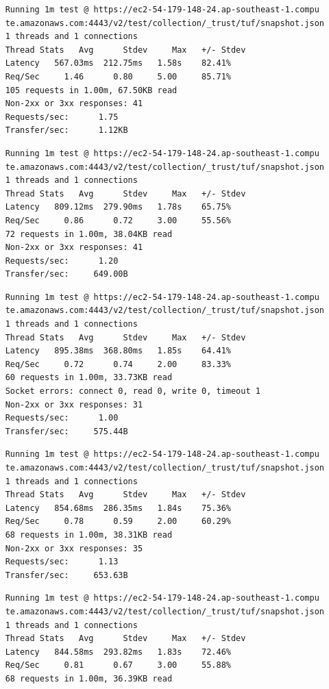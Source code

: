 \documentclass[a4paper,12pt]{article}
\newcounter{subsubsubsection}[subsubsection]
\begin{document}
{{\begin{verbatim}
	Running 1m test @ https://ec2-54-179-148-24.ap-southeast-1.compu
	te.amazonaws.com:4443/v2/test/collection/_trust/tuf/snapshot.json
	1 threads and 1 connections
	Thread Stats   Avg      Stdev     Max   +/- Stdev
	Latency   567.03ms  212.75ms   1.58s    82.41%
	Req/Sec     1.46      0.80     5.00     85.71%
	105 requests in 1.00m, 67.50KB read
	Non-2xx or 3xx responses: 41
	Requests/sec:      1.75
	Transfer/sec:      1.12KB
	\end{verbatim}
	\newpage
	\begin{verbatim}
	Running 1m test @ https://ec2-54-179-148-24.ap-southeast-1.compu
	te.amazonaws.com:4443/v2/test/collection/_trust/tuf/snapshot.json
	1 threads and 1 connections
	Thread Stats   Avg      Stdev     Max   +/- Stdev
	Latency   809.12ms  279.90ms   1.78s    65.75%
	Req/Sec     0.86      0.72     3.00     55.56%
	72 requests in 1.00m, 38.04KB read
	Non-2xx or 3xx responses: 41
	Requests/sec:      1.20
	Transfer/sec:     649.00B
	\end{verbatim}
	\begin{verbatim}
	Running 1m test @ https://ec2-54-179-148-24.ap-southeast-1.compu
	te.amazonaws.com:4443/v2/test/collection/_trust/tuf/snapshot.json
	1 threads and 1 connections
	Thread Stats   Avg      Stdev     Max   +/- Stdev
	Latency   895.38ms  368.80ms   1.85s    64.41%
	Req/Sec     0.72      0.74     2.00     83.33%
	60 requests in 1.00m, 33.73KB read
	Socket errors: connect 0, read 0, write 0, timeout 1
	Non-2xx or 3xx responses: 31
	Requests/sec:      1.00
	Transfer/sec:     575.44B
	\end{verbatim}
	\begin{verbatim}
	Running 1m test @ https://ec2-54-179-148-24.ap-southeast-1.compu
	te.amazonaws.com:4443/v2/test/collection/_trust/tuf/snapshot.json
	1 threads and 1 connections
	Thread Stats   Avg      Stdev     Max   +/- Stdev
	Latency   854.68ms  286.35ms   1.84s    75.36%
	Req/Sec     0.78      0.59     2.00     60.29%
	68 requests in 1.00m, 38.31KB read
	Non-2xx or 3xx responses: 35
	Requests/sec:      1.13
	Transfer/sec:     653.63B
	\end{verbatim}
	\begin{verbatim}
	Running 1m test @ https://ec2-54-179-148-24.ap-southeast-1.compu
	te.amazonaws.com:4443/v2/test/collection/_trust/tuf/snapshot.json
	1 threads and 1 connections
	Thread Stats   Avg      Stdev     Max   +/- Stdev
	Latency   844.58ms  293.82ms   1.83s    72.46%
	Req/Sec     0.81      0.67     3.00     55.88%
	68 requests in 1.00m, 36.39KB read

\end{verbatim}}}
\end{document}
